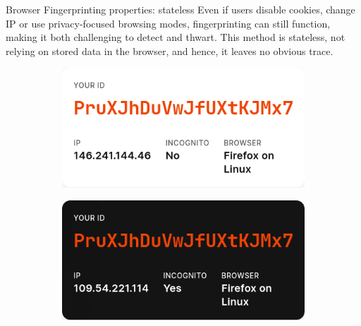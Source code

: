 \begin{frame}{Browser Fingerprinting properties: stateless}
  Even if users disable cookies, change IP or use privacy-focused browsing modes, fingerprinting can still function, making it both challenging to detect and thwart.
  This method is stateless, not relying on stored data in the browser, and hence, it leaves no obvious trace.

  \begin{figure}
    \centering
    \begin{subfigure}{0.45\textwidth}
      \includegraphics[width=\linewidth]{images/fingerprint-ip-1.png}
    \end{subfigure}
    \begin{subfigure}{0.45\textwidth}
      \includegraphics[width=\linewidth]{images/fingerprint-ip-2.png}
    \end{subfigure}
  \end{figure}
\end{frame}